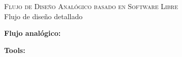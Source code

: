 \documentclass[ps,clariphy]{prosper}
\begin{document}
\begin{slide}{ \textsc{{\tiny Flujo de Dise\~no Anal\'ogico basado en Software Libre}}\\ Flujo de dise\~no detallado}
  \vspace{-0.5cm}
  \tiny{
\textbf{Flujo anal\'ogico:} 
    \begin{figure}[ht]
      \centering
    \end{figure}
    \textbf{Tools:}
\begin{figure}[ht]
      \centering
    \end{figure}    
  }
\end{slide}
\end{document}
